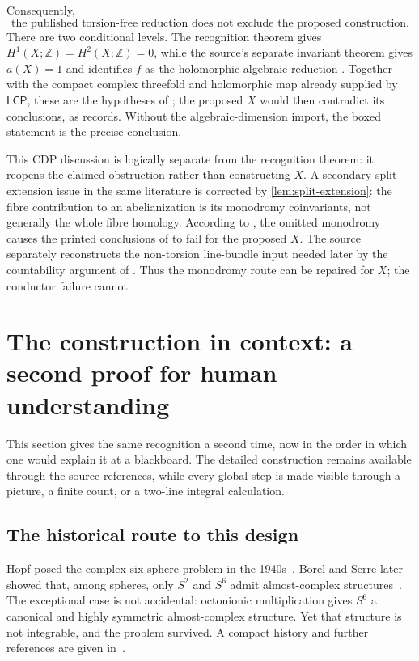 \documentclass[11pt,reqno]{amsart}
\numberwithin{equation}{section}
\newcommand{\Z}{\mathbb Z}
\newcommand{\LCP}{\mathsf{LCP}}
\theoremstyle{definition}
\begin{document}
Consequently,
\[
\boxed{\text{the published torsion-free reduction does not exclude the proposed construction.}}
\]
There are two conditional levels. The recognition theorem gives $H^1(X;\Z)=H^2(X;\Z)=0$, while the source's separate invariant theorem gives $a(X)=1$ and identifies $f$ as the holomorphic algebraic reduction \cite[Thm.~9.1]{S6}. Together with the compact complex threefold and holomorphic map already supplied by $\LCP$, these are the hypotheses of \cite[Thm.~2.2]{CDP20}; the proposed $X$ would then contradict its conclusions, as \cite[Cor.~10.6]{S6} records. Without the algebraic-dimension import, the boxed statement is the precise conclusion.

This CDP discussion is logically separate from the recognition theorem: it reopens the claimed obstruction rather than constructing $X$. A secondary split-extension issue in the same literature is corrected by \cref{lem:split-extension}: the fibre contribution to an abelianization is its monodromy coinvariants, not generally the whole fibre homology. According to \cite[\S10.5]{S6}, the omitted monodromy causes the printed conclusions of \cite[Lem.~4.2, Cor.~5.2, Prop.~5.5]{CDP20} to fail for the proposed $X$. The source separately reconstructs the non-torsion line-bundle input needed later by the countability argument of \cite[Prop.~10.8]{S6}. Thus the monodromy route can be repaired for $X$; the conductor failure cannot.

\section{The construction in context: a second proof for human understanding}\label{sec:explanation}

This section gives the same recognition a second time, now in the order in which one would explain it at a blackboard. The detailed construction remains available through the source references, while every global step is made visible through a picture, a finite count, or a two-line integral calculation.

\subsection{The historical route to this design}\label{sec:history-story}

Hopf posed the complex-six-sphere problem in the 1940s~\cite{Hopf}. Borel and Serre later showed that, among spheres, only $S^2$ and $S^6$ admit almost-complex structures~\cite{BorelSerre}. The exceptional case is not accidental: octonionic multiplication gives $S^6$ a canonical and highly symmetric almost-complex structure. Yet that structure is not integrable, and the problem survived. A compact history and further references are given in~\cite{Feng}.
\end{document}

